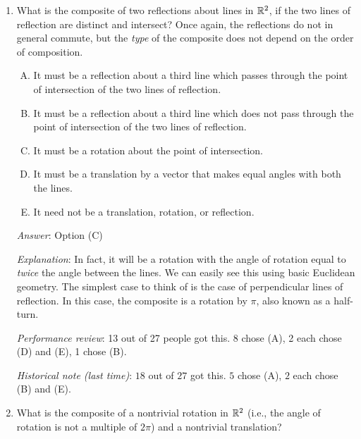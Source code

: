 \documentclass[10pt]{amsart}
\begin{document}
\begin{enumerate}
   {\em Answer}: Option (E)

   {\em Explanation}: The vector will in fact be twice the
   perpendicular difference vector between the lines.

   You can think about it in terms of double mirrors.

   {\em Performance review}: 16 out of 27 got this. 6 chose (A), 3
   chose (D), 1 chose (B).

   {\em Historical note (last time)}: $20$ out of $27$ got this. $3$ chose (D),
   $2$ each chose (A) and (C).
 \item What is the composite of two reflections about lines in $\mathbb{R}^2$,
   if the two lines of reflection are distinct and intersect? Once
   again, the reflections do not in general commute, but the {\em type}
   of the composite does not depend on the order of composition.

   \begin{enumerate}[(A)]
   \item It must be a reflection about a third line which passes
     through the point of intersection of the two lines of reflection.
   \item It must be a reflection about a third line which does not pass
     through the point of intersection of the two lines of reflection.
   \item It must be a rotation about the point of intersection.
   \item It must be a translation by a vector that makes equal angles
     with both the lines.
   \item It need not be a translation, rotation, or reflection.
   \end{enumerate}

   {\em Answer}: Option (C)

   {\em Explanation}: In fact, it will be a rotation with the angle of
   rotation equal to {\em twice} the angle between the lines. We can
   easily see this using basic Euclidean geometry. The simplest case
   to think of is the case of perpendicular lines of reflection. In
   this case, the composite is a rotation by $\pi$, also known as a
   half-turn.

   {\em Performance review}: 13 out of 27 people got this. 8 chose
   (A), 2 each chose (D) and (E), 1 chose (B).

   {\em Historical note (last time)}: $18$ out of $27$ got this. $5$
   chose (A), $2$ each chose (B) and (E).
 \item What is the composite of a nontrivial rotation in $\mathbb{R}^2$ (i.e.,
   the angle of rotation is not a multiple of $2\pi$) and a nontrivial
   translation?


\end{enumerate}
\end{document}
